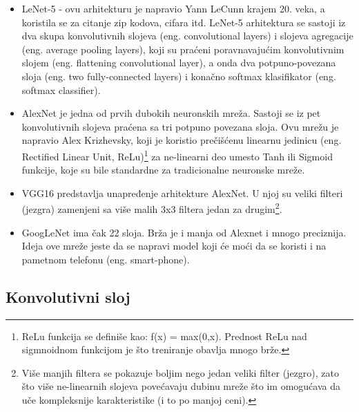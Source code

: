 \documentclass[a4paper]{article}
\begin{document}
\begin{itemize}

\item LeNet-5 - ovu arhitekturu je napravio Yann LeCunn krajem 20. veka, a koristila se za citanje zip kodova, cifara itd. LeNet-5 arhitektura se sastoji iz dva skupa konvolutivnih slojeva (eng. convolutional layers) i slojeva agregacije (eng. average pooling layers), koji su praćeni poravnavajućim konvolutivnim slojem (eng. flattening convolutional layer), a onda dva potpuno-povezana sloja (eng. two fully-connected layers) i konačno softmax klasifikator (eng. softmax classifier).

\item AlexNet je jedna od prvih dubokih neuronskih mreža. Sastoji se iz pet konvolutivnih slojeva praćena sa tri potpuno povezana sloja. Ovu mrežu je napravio Alex Krizhevsky, koji je koristio prečišćenu linearnu jedinicu (eng. Rectified Linear Unit, ReLu)\footnote{ReLu funkcija se definiše kao: f(x) = max(0,x). Prednost ReLu nad sigmnoidnom funkcijom je što treniranje obavlja mnogo brže.} za ne-linearni deo umesto Tanh ili Sigmoid funkcije, koje su bile standardne za tradicionalne neuronske mreže.

\item VGG16 predstavlja unapređenje arhitekture AlexNet. U njoj su veliki filteri (jezgra) zamenjeni sa više malih 3x3 filtera jedan za drugim\footnote{Više manjih filtera se pokazuje boljim nego jedan veliki filter (jezgro), zato što više ne-linearnih slojeva povećavaju dubinu mreže što im omogućava da uče kompleksnije karakteristike (i to po manjoj ceni).}.

\item GoogLeNet ima čak 22 sloja. Brža je i manja od Alexnet i mnogo preciznija. Ideja ove mreže jeste da se napravi model koji će moći da se koristi i na pametnom telefonu (eng. smart-phone).

\end{itemize}


\subsection{Konvolutivni sloj}
\label{konvolucija}
\end{document}
